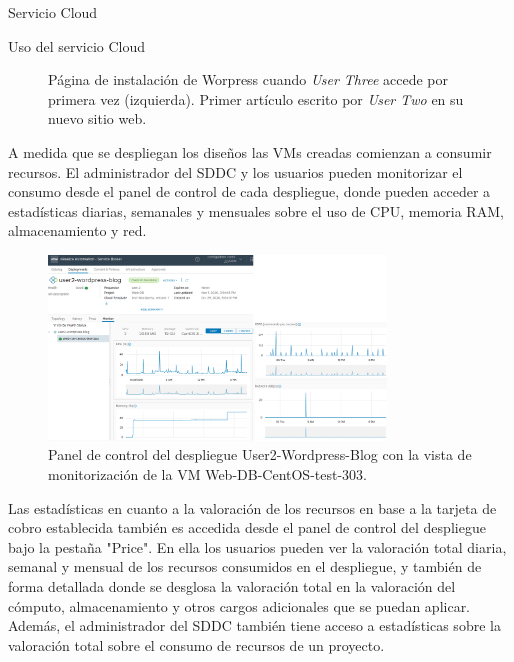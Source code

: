 \begin{subsection}{Servicio Cloud}
\begin{subsubsection}{Uso del servicio Cloud}
\begin{figure}[h]
            \caption{Página de instalación de Worpress cuando \textit{User Three} accede por primera vez (izquierda). Primer artículo escrito por \textit{User Two} en su nuevo sitio web.}
            \label{fig:wordpress-user-2}
        \end{figure}
        \FloatBarrier
        A medida que se despliegan los diseños las VMs creadas comienzan a consumir recursos. El administrador del SDDC y los usuarios pueden monitorizar el consumo desde el panel de control de cada despliegue, donde pueden acceder a estadísticas diarias, semanales y mensuales sobre el uso de CPU, memoria RAM, almacenamiento y red.
        \begin{figure}[h]
            \centering
            \includegraphics[width=0.8\textwidth]{imaxes/pruebaconcepto/vrealize/statistics-service-broker.png}
            \caption{Panel de control del despliegue User2-Wordpress-Blog con la vista de monitorización de la VM Web-DB-CentOS-test-303.}
            \label{fig:statistics-user-2}
        \end{figure}
        \FloatBarrier
        Las estadísticas en cuanto a la valoración de los recursos en base a la tarjeta de cobro establecida también es accedida desde el panel de control del despliegue bajo la pestaña "Price". En ella los usuarios pueden ver la valoración total diaria, semanal y mensual de los recursos consumidos en el despliegue, y también de forma detallada donde se desglosa la valoración total en la valoración del cómputo, almacenamiento y otros cargos adicionales que se puedan aplicar. Además, el administrador del SDDC también tiene acceso a estadísticas sobre la valoración total sobre el consumo de recursos de un proyecto. 
        

\end{subsubsection}
\end{subsection}
